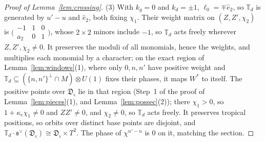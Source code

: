\begin{proof}[Proof of Lemma~\ref{lem:crossing}]
(3) With $k_g=0$ and $k_d=\pm1$, $\ell_0=\mp\hat e_2$, so $\mathbb T_d$ is generated by $u'-u$ and $\hat e_2$, both fixing
$\chi_1$. Their weight matrix on $(Z,Z',\chi_2)$ is $\bigl(\begin{smallmatrix}-1&1&0\\a_2&0&1\end{smallmatrix}\bigr)$,
whose $2\times2$ minors include $-1$, so $\mathbb T_d$ acts freely wherever $Z,Z',\chi_2\ne0$. It preserves the moduli of
all monomials, hence the weights, and multiplies each monomial by a character; on the exact region of
Lemma~\ref{lem:windows}(1), where only $0,n,n'$ have positive weight and $\mathbb T_d\subseteq(\{n,n'\}^\perp\cap M)\otimes
U(1)$ fixes their phases, it maps $W^*$ to itself. The positive points over $\mathfrak D_\varsigma$ lie in that region
(Step~1 of the proof of Lemma~\ref{lem:pieces}(1), and Lemma~\ref{lem:possec}(2)); there $\chi_1>0$, so $1+\kappa_e\chi_1\ne0$
and $ZZ'\ne0$, and $\chi_2\ne0$, so $\mathbb T_d$ acts freely. It preserves tropical positions, so orbits over distinct
base points are disjoint, and $\mathbb T_d\cdot\mathfrak s^\vee(\mathfrak D_\varsigma)\cong\mathfrak D_\varsigma\times T^2$.
The phase of $\chi^{n'-n}$ is $0$ on it, matching the section.
\end{proof}


